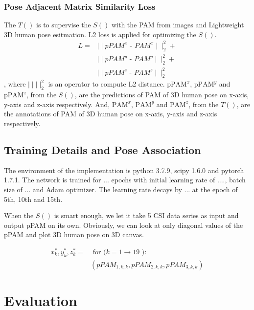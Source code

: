 \documentclass[conference]{IEEEtran}
\begin{document}
	
	\subsubsection{Pose Adjacent Matrix Similarity Loss}
	 
	 The $T()$ is to supervise the $S()$ with the PAM from images and Lightweight 3D human pose esitmation. L2 loss is applied for optimizing the $S()$.
	 \begin{equation}
	 \begin{aligned}
	 L = & \mid \mid pPAM^x \text{ - } PAM^x \mid \mid^2_2 + \\
	  & \mid \mid  pPAM^y \text{ - } PAM^y \mid \mid^2_2 + \\
	  & \mid \mid pPAM^z \text{ - } PAM^z \mid \mid^2_2
	 \label{eq:L2}
	 \end{aligned}
	 \end{equation}, where $\mid \mid  \mid \mid^2_2$ is an operator to compute L2 distance. $\text{pPAM}^x$, $\text{pPAM}^y$ and $\text{pPAM}^z$, from the $S()$, are the predictions  of PAM of 3D human pose on x-axis, y-axis and z-axis respectively. And, $\text{PAM}^x$, $\text{PAM}^y$ and $\text{PAM}^z$, from the $T()$, are the annotations of PAM of 3D human pose on x-axis, y-axis and z-axis respectively.
	 
	  
	 \subsection{Training Details and Pose Association}
	 
	 The environment of the implementation is python 3.7.9, scipy 1.6.0 and pytorch 1.7.1.
	 The network is trained for ... epochs with initial learning
	 rate of ...., batch size of ... and Adam optimizer. The learning rate decays by ... at the epoch of
	 5th, 10th and 15th.

	When the $S()$ is smart enough, we let it take 5 CSI data series as input and output pPAM on its own. Obviously, we can look at only diagonal values of the pPAM and plot 3D human pose on 3D canvas.
	
	
	\begin{equation}
	 \begin{aligned}
	 x_k^*,y_k^*,z_k^* = & \text{ for ($k = 1 \rightarrow 19$ ):} \\
	  & (pPAM_{1,k,k},pPAM_{2,k,k},pPAM_{3,k,k})
	 \end{aligned}
	\end{equation}
	\fi
	
	\section{Evaluation}
	
\end{document}

